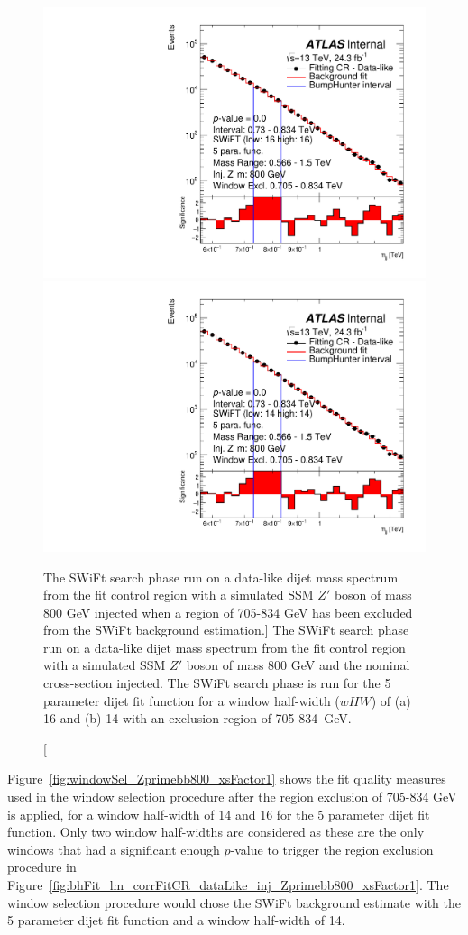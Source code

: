 \begin{figure}[!htb]
\captionsetup[subfigure]{aboveskip=0pt,justification=centering}
\centering
{} {
  \includegraphics[width=0.45\linewidth, angle=0]{figs/Dibjet/LowMass/FitStudy_min566/bhFit_corrFitCR_dataLike_5para_low16_high16_inj_Zprimebb800_xsFactor1_removedWindow.pdf}
}
 {
  \includegraphics[width=0.45\linewidth, angle=0]{figs/Dibjet/LowMass/FitStudy_min566/bhFit_corrFitCR_dataLike_5para_low14_high14_inj_Zprimebb800_xsFactor1_removedWindow.pdf}
}

\caption
    [The SWiFt search phase run on a data-like dijet mass spectrum
      from the fit control region with a simulated SSM $Z'$ boson of mass 800 GeV injected when a region of 705-834 GeV has been excluded from the SWiFt background estimation.]
    {\label{fig:bhFit_lm_corrFitCR_dataLike_inj_Zprimebb800_xsFactor1_removedWindow}
      The SWiFt search phase run on a data-like dijet mass spectrum
      from the fit control region with a simulated SSM $Z'$ boson of mass 800 GeV and the nominal cross-section injected.
      The SWiFt search phase is run for the 5 parameter dijet fit function for a window half-width ($wHW$) of (a) 16 and (b) 14
      with an exclusion region of 705-834~GeV.}
\end{figure}


Figure~\ref{fig:windowSel_Zprimebb800_xsFactor1} shows the fit quality measures used in the window selection procedure after the region exclusion of 705-834 GeV is applied,
for a window half-width of 14 and 16 for the 5 parameter dijet fit function.
Only two window half-widths are considered as these are the only windows that had a significant enough $p$-value to trigger the region exclusion procedure in
Figure~\ref{fig:bhFit_lm_corrFitCR_dataLike_inj_Zprimebb800_xsFactor1}.
The window selection procedure would chose the SWiFt background estimate with the 5 parameter dijet fit function and a window half-width of 14.

